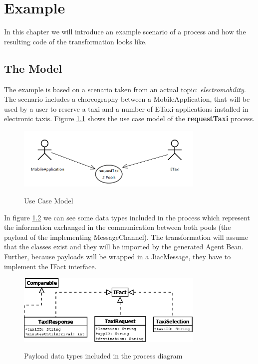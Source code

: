\chapter{Example}
\label{chap:examples}

In this chapter we will introduce an example scenario of a process and how the resulting code of the transformation looks like.

\section{The Model}
The example is based on a scenario taken from an actual topic: \textit{electromobility}. The scenario includes a choreography between a MobileApplication, that will be used by a user to reserve a taxi and a number of ETaxi-applications installed in electronic taxis. Figure \ref{fig:usecase} shows the use case model of the \textbf{requestTaxi} process. 
\begin{figure}[h]
	\centering
		\includegraphics[width=0.8\textwidth]{images/example/usecase.png}
	\label{fig:usecase}
	\caption{Use Case Model}
\end{figure}

In figure \ref{fig:payloads} we can see some data types included in the process which represent the information exchanged in the communication between both pools (the payload of the implementing MessageChannel). The transformation will assume that the classes exist and they will be imported by the generated Agent Bean. Further, because payloads will be wrapped in a JiacMessage, they have to implement the IFact interface.
\begin{figure}[h]
	\centering
		\includegraphics[width=0.8\textwidth]{images/example/payloads.png}
	\label{fig:payloads}
	\caption{Payload data types included in the process diagram}
\end{figure}

